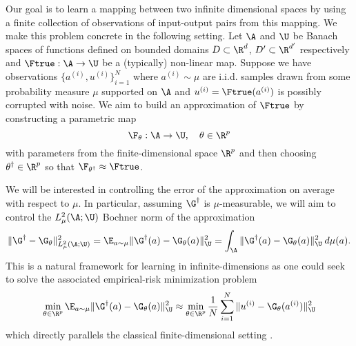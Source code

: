 


Our goal is to learn a mapping between two infinite dimensional spaces by using a finite
collection of observations of input-output pairs from this mapping. We make this problem concrete in the following setting. Let \(\A\) and \(\U\) 
be Banach spaces of functions defined on bounded domains $D \subset \R^d$, $D' \subset \R^{d'}$ respectively and \(\Ftrue : \A \to \U\) be
a (typically) non-linear map. Suppose we have observations \(\{a^{(i)}, u^{(i)}\}_{i=1}^N\) where 
\(a^{(i)} \sim \mu\) are i.i.d. samples drawn from some probability measure \(\mu\) supported on 
\(\A\) and \(u^{(i)} = \Ftrue(a^{(i)})\) is possibly corrupted with noise. We aim to build an approximation of \(\Ftrue\) by 
constructing a parametric map 
\begin{equation}
\label{eq:approxmap2}
\F_{\theta} : \A \to \U, \quad \theta \in \R^p
\end{equation}
with parameters from the finite-dimensional space \(\R^p\) and then choosing
\(\theta^\dagger \in \R^p\) so that \(\F_{\theta^\dagger} \approx \Ftrue\).

We will be interested in controlling the error of the approximation on average with respect to \(\mu\). In particular, assuming \(\G^\dagger\) is \(\mu\)-measurable, we will aim to control
the \(L^2_\mu(\A;\U)\) Bochner norm of the approximation
\begin{equation}
\label{eq:bochner_error}
\|\G^\dagger - \G_\theta\|^2_{L^2_\mu(\A;\U)} = \E_{a \sim \mu} \|\G^\dagger(a) - \G_\theta(a)\|_{\U}^2 = \int_\A \|\G^\dagger(a) - \G_\theta(a)\|_{\U}^2 \: d \mu (a).
\end{equation}
This is a natural framework for learning in infinite-dimensions as one could seek to solve the associated  empirical-risk minimization problem
\begin{equation}
\label{eq:empirical_risk}
\min_{\theta \in \R^p} \E_{a \sim \mu} \|\G^\dagger(a) - \G_\theta(a)\|_{\U}^2 \approx \min_{\theta \in \R^p} \frac{1}{N} \sum_{i=1}^N \|u^{(i)} - \G_\theta(a^{(i)})\|_{\U}^2
\end{equation}
which directly parallels the classical finite-dimensional 
setting \citep{Vapnik1998}. 

